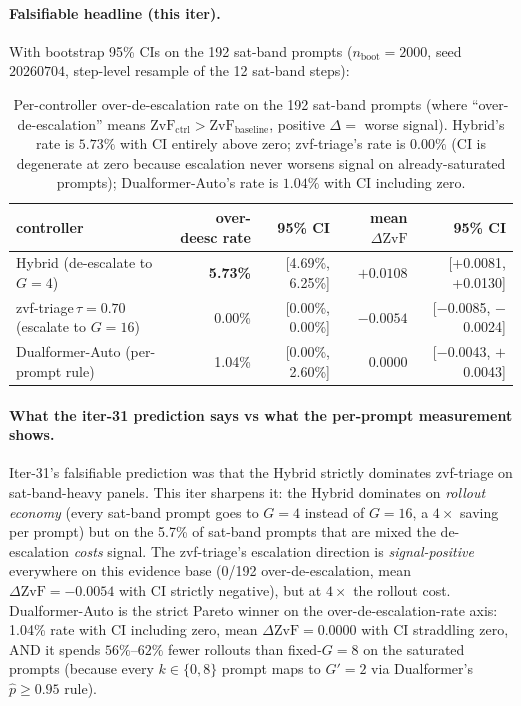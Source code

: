 \paragraph{Falsifiable headline (this iter).}
With bootstrap 95\% CIs on the 192 sat-band prompts
($n_\mathrm{boot}{=}2000$, seed~$20260704$, step-level resample of the
12 sat-band steps):

\begin{table}[t]
\centering
\caption{Per-controller over-de-escalation rate on the 192 sat-band
prompts (where ``over-de-escalation'' means $\mathrm{ZvF}_\mathrm{ctrl} > \mathrm{ZvF}_\text{baseline}$,
positive $\Delta =$ worse signal). Hybrid's rate is $5.73\%$ with CI
entirely above zero; zvf-triage's rate is $0.00\%$ (CI is degenerate at
zero because escalation never worsens signal on already-saturated
prompts); Dualformer-Auto's rate is $1.04\%$ with CI including zero.}
\label{tab:p7-satband-overdeesc}
\begin{tabular}{lrrrr}
\toprule
controller & over-deesc rate & 95\% CI & mean $\Delta\mathrm{ZvF}$ & 95\% CI \\
\midrule
Hybrid (de-escalate to $G{=}4$) & \textbf{5.73\%} & [4.69\%, 6.25\%] & $+0.0108$ & [+0.0081, +0.0130] \\
zvf-triage$\,\tau{=}0.70$ (escalate to $G{=}16$) & 0.00\% & [0.00\%, 0.00\%] & $-0.0054$ & [$-$0.0085, $-$0.0024] \\
Dualformer-Auto (per-prompt rule) & 1.04\% & [0.00\%, 2.60\%] & $0.0000$ & [$-$0.0043, $+$0.0043] \\
\bottomrule
\end{tabular}
\end{table}

\paragraph{What the iter-31 prediction says vs what the per-prompt
measurement shows.}
Iter-31's falsifiable prediction was that the Hybrid strictly
dominates zvf-triage on sat-band-heavy panels. This iter sharpens it:
the Hybrid dominates on \emph{rollout economy} (every sat-band prompt
goes to $G{=}4$ instead of $G{=}16$, a $4\times$ saving per prompt)
but on the 5.7\% of sat-band prompts that are mixed the de-escalation
\emph{costs} signal. The zvf-triage's escalation direction is
\emph{signal-positive} everywhere on this evidence base (0/192
over-de-escalation, mean $\Delta\mathrm{ZvF}=-0.0054$ with CI strictly
negative), but at $4\times$ the rollout cost. Dualformer-Auto is the
strict Pareto winner on the over-de-escalation-rate axis: 1.04\% rate
with CI including zero, mean $\Delta\mathrm{ZvF}=0.0000$ with CI
straddling zero, AND it spends $56\%$--$62\%$ fewer rollouts than
fixed-$G{=}8$ on the saturated prompts (because every $k \in \{0,8\}$
prompt maps to $G'=2$ via Dualformer's $\hat p \ge 0.95$ rule).


